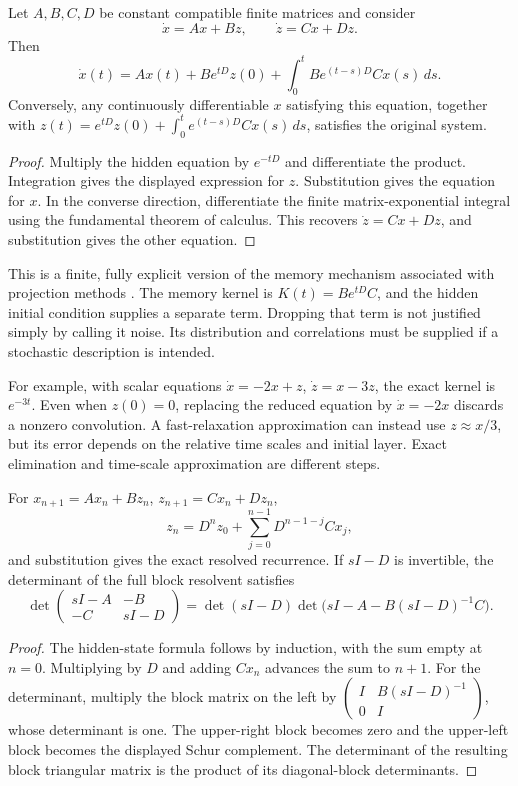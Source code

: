 \begin{theorem}
\label{thm:fluid-memory}
Let $A,B,C,D$ be constant compatible finite matrices and consider
\[
 \dot x=Ax+Bz,\qquad \dot z=Cx+Dz.
\]
Then
\[
 \dot x(t)=Ax(t)+Be^{tD}z(0)
       +\int_0^t Be^{(t-s)D}Cx(s)\,ds.
\]
Conversely, any continuously differentiable $x$ satisfying this equation, together with
$z(t)=e^{tD}z(0)+\int_0^t e^{(t-s)D}Cx(s)\,ds$, satisfies the original system.
\end{theorem}
\begin{proof}
Multiply the hidden equation by $e^{-tD}$ and differentiate the product. Integration gives the displayed expression for $z$. Substitution gives the equation for $x$. In the converse direction, differentiate the finite matrix-exponential integral using the fundamental theorem of calculus. This recovers $\dot z=Cx+Dz$, and substitution gives the other equation.
\end{proof}

This is a finite, fully explicit version of the memory mechanism associated with projection methods \cite{NSMori1965}. The memory kernel is $K(t)=Be^{tD}C$, and the hidden initial condition supplies a separate term. Dropping that term is not justified simply by calling it noise. Its distribution and correlations must be supplied if a stochastic description is intended.

For example, with scalar equations $\dot x=-2x+z$, $\dot z=x-3z$, the exact kernel is $e^{-3t}$. Even when $z(0)=0$, replacing the reduced equation by $\dot x=-2x$ discards a nonzero convolution. A fast-relaxation approximation can instead use $z\approx x/3$, but its error depends on the relative time scales and initial layer. Exact elimination and time-scale approximation are different steps.

\begin{proposition}
\label{prop:fluid-discrete-memory}
For $x_{n+1}=Ax_n+Bz_n$, $z_{n+1}=Cx_n+Dz_n$,
\[
 z_n=D^nz_0+\sum_{j=0}^{n-1}D^{n-1-j}Cx_j,
\]
and substitution gives the exact resolved recurrence. If $sI-D$ is invertible, the determinant of the full block resolvent satisfies
\[
 \det\begin{pmatrix}sI-A&-B\\-C&sI-D\end{pmatrix}
 =\det(sI-D)\det\bigl(sI-A-B(sI-D)^{-1}C\bigr).
\]
\end{proposition}
\begin{proof}
The hidden-state formula follows by induction, with the sum empty at $n=0$. Multiplying by $D$ and adding $Cx_n$ advances the sum to $n+1$. For the determinant, multiply the block matrix on the left by
$\left(\begin{smallmatrix}I&B(sI-D)^{-1}\\0&I\end{smallmatrix}\right)$, whose determinant is one. The upper-right block becomes zero and the upper-left block becomes the displayed Schur complement. The determinant of the resulting block triangular matrix is the product of its diagonal-block determinants.
\end{proof}

